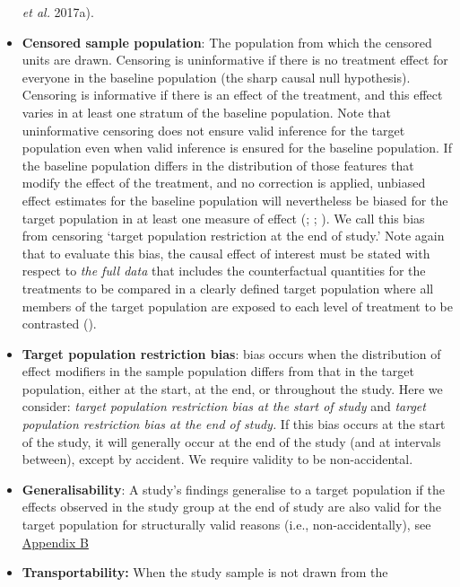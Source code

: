\documentclass[
  single column]{article}
\begin{document}
\begin{itemize}
{  \emph{et al.} 2017a}).
\item
  \textbf{Censored sample population}: The population from which the
  censored units are drawn. Censoring is uninformative if there is no
  treatment effect for everyone in the baseline population (the sharp
  causal null hypothesis). Censoring is informative if there is an
  effect of the treatment, and this effect varies in at least one
  stratum of the baseline population. Note that uninformative censoring
  does not ensure valid inference for the target population even when
  valid inference is ensured for the baseline population. If the
  baseline population differs in the distribution of those features that
  modify the effect of the treatment, and no correction is applied,
  unbiased effect estimates for the baseline population will
  nevertheless be biased for the target population in at least one
  measure of effect (; ;
  ). We call this bias
  from censoring `target population restriction at the end of study.'
  Note again that to evaluate this bias, the causal effect of interest
  must be stated with respect to \emph{the full data} that includes the
  counterfactual quantities for the treatments to be compared in a
  clearly defined target population where all members of the target
  population are exposed to each level of treatment to be contrasted
  ().
\item
  \textbf{Target population restriction bias}: bias occurs when the
  distribution of effect modifiers in the sample population differs from
  that in the target population, either at the start, at the end, or
  throughout the study. Here we consider: \emph{target population
  restriction bias at the start of study} and \emph{target population
  restriction bias at the end of study.} If this bias occurs at the
  start of the study, it will generally occur at the end of the study
  (and at intervals between), except by accident. We require validity to
  be non-accidental.
\item
  \textbf{Generalisability}: A study's findings generalise to a target
  population if the effects observed in the study group at the end of
  study are also valid for the target population for structurally valid
  reasons (i.e., non-accidentally), see \hyperref[id-app-b]{Appendix B}
\item
  \textbf{Transportability:} When the study sample is not drawn from the

\end{itemize}
\end{document}
